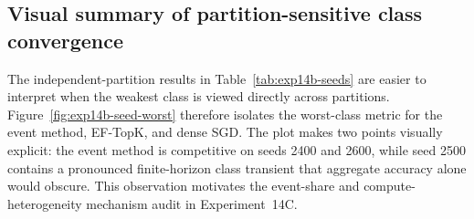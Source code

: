 \subsection{Visual summary of partition-sensitive class convergence}

The independent-partition results in Table~\ref{tab:exp14b-seeds} are easier to interpret when the weakest class is viewed directly across partitions. Figure~\ref{fig:exp14b-seed-worst} therefore isolates the worst-class metric for the event method, EF-TopK, and dense SGD. The plot makes two points visually explicit: the event method is competitive on seeds 2400 and 2600, while seed 2500 contains a pronounced finite-horizon class transient that aggregate accuracy alone would obscure. This observation motivates the event-share and compute-heterogeneity mechanism audit in Experiment~14C.

\ExpFourteenBSeedFigure
